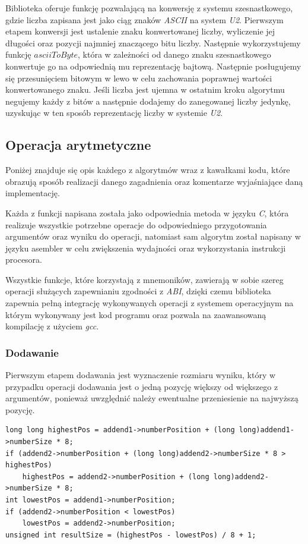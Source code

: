 \documentclass{article}
\begin{document}
Biblioteka oferuje funkcję pozwalającą na konwersję z systemu szesnastkowego, gdzie liczba zapisana jest jako ciąg znaków \textit{ASCII} na system \textit{U2}. Pierwszym etapem konwersji jest ustalenie znaku konwertowanej liczby, wyliczenie jej długości oraz pozycji najmniej znaczącego bitu liczby. Następnie wykorzystujemy funkcję $asciiToByte$, która w zależności od danego znaku szesnastkowego konwertuje go na odpowiednią mu reprezentację bajtową. Następnie posługujemy się przesunięciem bitowym w lewo w celu zachowania poprawnej wartości konwertowanego znaku. Jeśli liczba jest ujemna w ostatnim kroku algorytmu negujemy każdy z bitów a następnie dodajemy do zanegowanej liczby jedynkę, uzyskując w ten sposób reprezentację liczby w systemie \textit{U2}.

\subsection{Operacja arytmetyczne}

Poniżej znajduje się opis każdego z algorytmów wraz z kawałkami kodu, które obrazują sposób realizacji danego zagadnienia oraz komentarze wyjaśniające daną implementację.

Każda z funkcji napisana została jako odpowiednia metoda w języku \textit{C}, która realizuje wszystkie potrzebne operacje do odpowiedniego przygotowania argumentów oraz wyniku do operacji, natomiast sam algorytm został napisany w języku asembler w celu zwiększenia wydajności oraz wykorzystania instrukcji procesora.

Wszystkie funkcje, które korzystają z mnemoników, zawierają w sobie szereg operacji służących zapewnianiu zgodności z \textit{ABI}, dzięki czemu biblioteka zapewnia pełną integrację wykonywanych operacji z systemem operacyjnym na którym wykonywany jest kod programu oraz pozwala na zaawansowaną kompilację z użyciem \textit{gcc}.

\clearpage

\subsubsection{Dodawanie}

Pierwszym etapem dodawania jest wyznaczenie rozmiaru wyniku, który w przypadku operacji dodawania jest o jedną pozycję większy od większego z argumentów, ponieważ uwzględnić należy ewentualne przeniesienie na najwyższą pozycję.

\begin{verbatim}
long long highestPos = addend1->numberPosition + (long long)addend1->numberSize * 8;
if (addend2->numberPosition + (long long)addend2->numberSize * 8 > highestPos)
    highestPos = addend2->numberPosition + (long long)addend2->numberSize * 8;
int lowestPos = addend1->numberPosition;
if (addend2->numberPosition < lowestPos)
    lowestPos = addend2->numberPosition;
unsigned int resultSize = (highestPos - lowestPos) / 8 + 1;
\end{verbatim}
\end{document}
